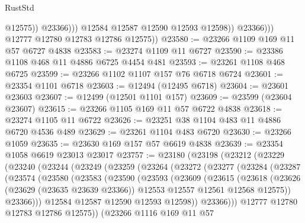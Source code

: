 \begin{lexlean}{RustStd}
\begin{coremodule}
                            @12575))
                        @23366)))
                  @12584
                  @12587
                  @12590
                  @12593
                  @12598))
              @23366)))
        @12777
        @12780
        @12783
        @12786
        @12575))
@23580 := @23266 @1109 @169 @11 @57 @6727 @4838
@23583 := @23274 @1109 @11 @6727
@23590 := @23386 @1108 @468 @11 @4886 @6725 @4454 @481
@23593 := @23261 @1108 @468 @6725
@23599 := @23266 @1102 @1107 @157 @76 @6718 @6724
@23601 := @23354 @1101 @6718
@23603 := @12494 (@12495 @6718)
@23604 := @23601 @23603
@23607 := @12499 (@12501 @1101 @157)
@23609 := @23599 (@23604 @23607)
@23615 := @23266 @1105 @169 @11 @57 @6722 @4838
@23618 := @23274 @1105 @11 @6722
@23626 := @23251 @38 @1104 @483 @11 @4886 @6720 @4536 @489
@23629 := @23261 @1104 @483 @6720
@23630 := @23266 @1059
@23635 := @23630 @169 @157 @57 @6619 @4838
@23639 := @23354 @1058 @6619 @23013 @23017
@23757 := @23180
    (@23198
      (@23212
        (@23229
          (@23240
            (@23244
              (@23249
                (@23259
                  (@23264
                    (@23272
                      (@23277
                        (@23284
                          (@23287
                            (@23574
                              (@23580
                                (@23583
                                  (@23590
                                    (@23593
                                      (@23609
                                        (@23615
                                          (@23618
                                            (@23626
                                              (@23629 (@23635 @23639 @23366))
                                              @12553
                                              @12557
                                              @12561
                                              @12568
                                              @12575))
                                          @23366)))
                                    @12584
                                    @12587
                                    @12590
                                    @12593
                                    @12598))
                                @23366)))
                          @12777
                          @12780
                          @12783
                          @12786
                          @12575))
                      (@23266
                        @1116
                        @169
                        @11
                        @57

\end{coremodule}
\end{lexlean}

